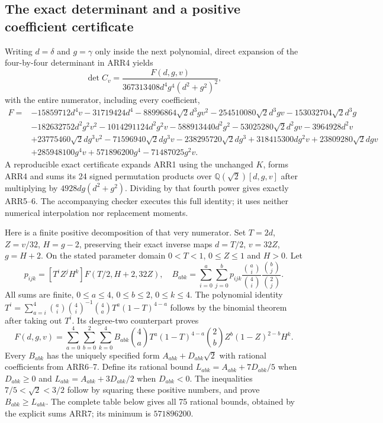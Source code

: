 \documentclass[11pt]{article}
\begin{document}
\subsection{The exact determinant and a positive coefficient certificate}
Writing $d=\delta$ and $g=\gamma$ only inside the next polynomial,
direct expansion of the four-by-four determinant in ARR4 yields
\[
 \det C_v=\frac{F(d,g,v)}{367313408d^4g^4(d^2+g^2)^2},
 \tag{ARR5}
\]
with the entire numerator, including every coefficient,
\[
\begin{aligned}
F={}&-15859712d^4v-31719424d^4
 -88996864\sqrt2d^3gv^2-254510080\sqrt2d^3gv
 -153032704\sqrt2d^3g\\
&-182632752d^2g^2v^2-1014291124d^2g^2v
 -588913440d^2g^2-53025280\sqrt2d^2gv-3964928d^2v\\
&+23775460\sqrt2dg^3v^2-71596940\sqrt2dg^3v
 -238295720\sqrt2dg^3+318415300dg^2v
 +23809280\sqrt2dgv\\
&+285948100g^4v+571896200g^4-71487025g^2v.
\end{aligned}\tag{ARR6}
\]
A reproducible exact certificate expands ARR1 using the unchanged
$K$, forms ARR4 and sums its 24 signed permutation products over
$\mathbb Q(\sqrt2)[d,g,v]$ after multiplying by
$4928dg(d^2+g^2)$. Dividing by that fourth power gives exactly
ARR5--6. The accompanying checker executes this full identity;
it uses neither numerical interpolation nor replacement moments.

Here is a finite positive decomposition of that very numerator.
Set $T=2d$, $Z=v/32$, $H=g-2$, preserving their exact inverse
maps $d=T/2$, $v=32Z$, $g=H+2$. On the stated parameter domain
$0<T<1$, $0\le Z\le1$ and $H>0$. Let
\[
 p_{ijk}=[T^iZ^jH^k]F(T/2,H+2,32Z),\quad
 B_{abk}=\sum_{i=0}^a\sum_{j=0}^b
  p_{ijk}\frac{\binom ai}{\binom4i}
          \frac{\binom bj}{\binom2j}.
 \tag{ARR7}
\]
All sums are finite, $0\le a\le4$, $0\le b\le2$, $0\le k\le4$.
The polynomial identity
$T^i=\sum_{a=i}^4\binom ai\binom4i^{-1}
\binom4aT^a(1-T)^{4-a}$ follows by the binomial theorem after
taking out $T^i$. Its degree-two counterpart proves
\[
 F(d,g,v)=\sum_{a=0}^4\sum_{b=0}^2\sum_{k=0}^4
 B_{abk}\binom4aT^a(1-T)^{4-a}
              \binom2bZ^b(1-Z)^{2-b}H^k.
 \tag{ARR8}
\]
Every $B_{abk}$ has the uniquely specified form $A_{abk}+D_{abk}\sqrt2$
with rational coefficients from ARR6--7. Define its rational bound
$L_{abk}=A_{abk}+7D_{abk}/5$ when $D_{abk}\ge0$ and
$L_{abk}=A_{abk}+3D_{abk}/2$ when $D_{abk}<0$.
The inequalities $7/5<\sqrt2<3/2$ follow by squaring these
positive numbers, and prove $B_{abk}\ge L_{abk}$.
The complete table below gives all 75 rational bounds, obtained by
the explicit sums ARR7; its minimum is $571896200$.
\end{document}
